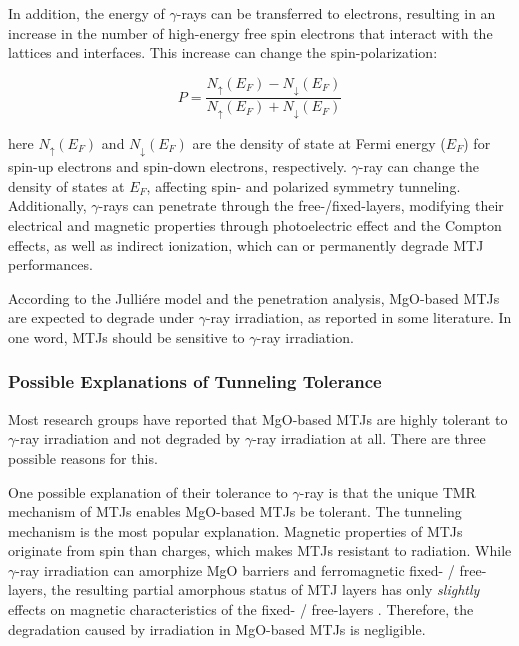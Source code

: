 \documentclass[molecules,review,submit,pdftex,moreauthors]{Definitions/mdpi}
\begin{document}
In addition, the energy of $\gamma$-rays can be transferred to electrons, resulting in an increase in the number of high-energy free spin electrons that interact with the lattices and interfaces.  This increase can change the spin-polarization:


\begin{equation}
	P = \frac{N_{\uparrow}(E_F) - N_{\downarrow}(E_F)}{N_{\uparrow}(E_F) + N_{\downarrow}(E_F)}
\end{equation}


\noindent here $N_{\uparrow}(E_F)$ and $N_{\downarrow}(E_F)$ are the density of state at Fermi energy ($E_F$) for spin-up electrons and spin-down electrons, respectively.  $\gamma$-ray can change the density of states at $E_F$, affecting spin- and polarized symmetry tunneling.  Additionally, $\gamma$-rays can penetrate through the free-/fixed-layers, modifying their electrical and magnetic properties through  photoelectric effect and the Compton effects, as well as indirect ionization, which can  or permanently degrade MTJ performances.  


According to the Julli\'{e}re model and the penetration analysis, MgO-based MTJs are expected to degrade under $\gamma$-ray irradiation, as reported in some literature.  In one word, MTJs should be sensitive to $\gamma$-ray irradiation. 


\subsubsection{Possible Explanations of Tunneling Tolerance}


Most research groups have reported that MgO-based MTJs are highly tolerant to $\gamma$-ray irradiation and not degraded by $\gamma$-ray irradiation at all.  There are three possible reasons for this. 


One possible explanation of their tolerance to $\gamma$-ray is that the unique TMR mechanism of MTJs enables MgO-based MTJs be tolerant.  The tunneling mechanism is the most popular explanation.  Magnetic properties of MTJs originate from spin than charges, which makes MTJs resistant to radiation.  While $\gamma$-ray irradiation can amorphize MgO barriers and ferromagnetic fixed- / free-layers, the resulting partial amorphous status of MTJ layers has only \emph{slightly} effects on magnetic characteristics of the fixed- / free-layers \cite{Wang2016NL}.  Therefore, the degradation caused by irradiation in MgO-based MTJs is negligible.  
\end{document}
